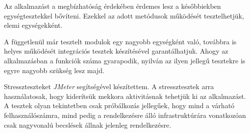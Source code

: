 Az alkalmazást a megbízhatóság érdekében érdemes lesz a későbbiekben egységtesztekkel bővíteni. Ezekkel az adott metódusok működését tesztelhetjük, elemi egységekként.

A függetlenül már tesztelt modulok egy nagyobb egységként való, továbbra is helyes működését integrációs tesztek készítésével garantálhatjuk. Ahogy az alkalmazásban a funkciók száma gyarapodik, nyilván az ilyen jellegű tesztekre is egyre nagyobb szükség lesz majd.

Stresszteszteket \textit{JMeter} segítségével készítettem. A stressztesztek arra használatosak, hogy kiderítsük mekkora aktivitásnak tehetjük ki az alkalmazást. A tesztek olyan tekintetben csak próbálkozás jellegűek, hogy mind a várható felhasználószámra, mind pedig a rendelkezésre álló infrastruktúrára vonatkozóan csak nagyvonalú becslések állnak jelenleg rendelkezésre.
